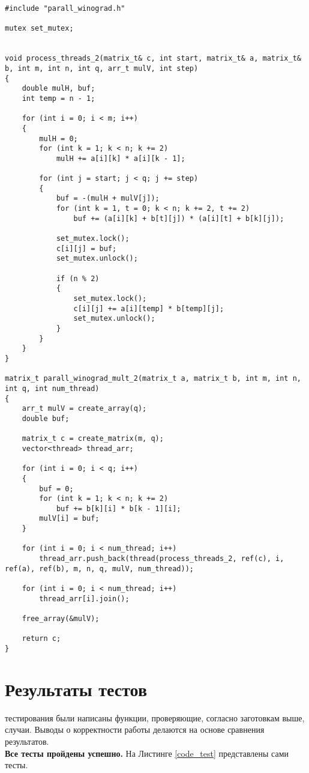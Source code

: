 \begin{lstlisting}[label=code3, caption = Распараллеленный алгоритм Винограда (2 вариант)]
#include "parall_winograd.h"

mutex set_mutex;


void process_threads_2(matrix_t& c, int start, matrix_t& a, matrix_t& b, int m, int n, int q, arr_t mulV, int step)
{
	double mulH, buf;
	int temp = n - 1;
	
	for (int i = 0; i < m; i++)
	{
		mulH = 0;
		for (int k = 1; k < n; k += 2)
			mulH += a[i][k] * a[i][k - 1];
		
		for (int j = start; j < q; j += step)
		{
			buf = -(mulH + mulV[j]);
			for (int k = 1, t = 0; k < n; k += 2, t += 2)
				buf += (a[i][k] + b[t][j]) * (a[i][t] + b[k][j]);
			
			set_mutex.lock();
			c[i][j] = buf;
			set_mutex.unlock();
			
			if (n % 2)
			{
				set_mutex.lock();
				c[i][j] += a[i][temp] * b[temp][j];
				set_mutex.unlock();
			}
		}
	}
}

matrix_t parall_winograd_mult_2(matrix_t a, matrix_t b, int m, int n, int q, int num_thread)
{
	arr_t mulV = create_array(q);
	double buf;
	
	matrix_t c = create_matrix(m, q);
	vector<thread> thread_arr;
	
	for (int i = 0; i < q; i++)
	{
		buf = 0;
		for (int k = 1; k < n; k += 2)
			buf += b[k][i] * b[k - 1][i];
		mulV[i] = buf;
	}
	
	for (int i = 0; i < num_thread; i++)
		thread_arr.push_back(thread(process_threads_2, ref(c), i, ref(a), ref(b), m, n, q, mulV, num_thread));
	
	for (int i = 0; i < num_thread; i++)
		thread_arr[i].join();
	
	free_array(&mulV);
	
	return c;
}
\end{lstlisting}


\section{Результаты тестов}
 тестирования были написаны функции, проверяющие, согласно заготовкам выше, случаи. Выводы о корректности работы делаются на основе сравнения результатов.\\

\textbf{Все тесты пройдены успешно.} На Листинге \ref{code_test} представлены сами тесты.

